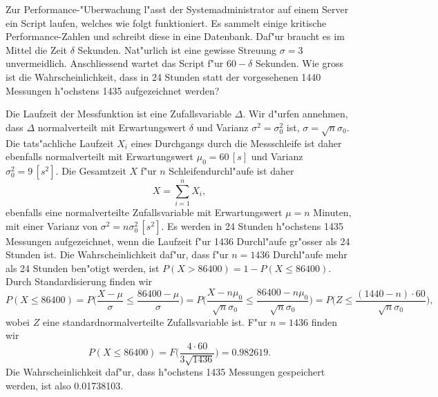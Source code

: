 Zur Performance-"Uberwachung l"asst der Systemadministrator auf einem Server
ein Script laufen, welches wie folgt funktioniert. Es sammelt einige
kritische Performance-Zahlen und schreibt diese in eine Datenbank.
Daf"ur braucht es im Mittel die Zeit $\delta$ Sekunden. Nat"urlich
ist eine gewisse Streuung $\sigma=3$ unvermeidlich.
Anschliessend wartet das Script f"ur $60-\delta$ Sekunden.
Wie gross ist die Wahrscheinlichkeit, dass in 24 Stunden statt
der vorgesehenen 1440 Messungen h"ochstens 1435 aufgezeichnet werden?

\begin{loesung}
Die Laufzeit der Messfunktion ist eine Zufallsvariable $\Delta$.
Wir d"urfen annehmen, dass $\Delta$ normalverteilt mit Erwartungswert
$\delta$ und Varianz $\sigma^2=\sigma_0^2$ ist, $\sigma=\sqrt{n}\sigma_0$.
Die tats"achliche Laufzeit $X_i$ eines
Durchgangs durch die Messschleife ist daher ebenfalls normalverteilt
mit Erwartungswert $\mu_0=60\,[s]$ und Varianz $\sigma_0^2=9\,[s^2]$.
Die Gesamtzeit $X$ f"ur
$n$ Schleifendurchl"aufe ist daher
\[
X=\sum_{i=1}^nX_i,
\]
ebenfalls eine normalverteilte Zufallsvariable
mit Erwartungswert $\mu = n$ Minuten,
mit einer Varianz von $\sigma^2=n\sigma_0^2\,[s^2]$.
Es werden in 24 Stunden h"ochstens 1435 Messungen aufgezeichnet,
wenn die Laufzeit f"ur
1436 Durchl"aufe gr"osser als 24 Stunden ist. Die Wahrscheinlichkeit daf"ur,
dass f"ur $n=1436$ Durchl"aufe mehr als 24 Stunden ben"otigt werden, 
ist $P(X > 86400) = 1-P(X\le 86400)$.
Durch Standardisierung finden wir
\[
P(X\le 86400)=P\biggl(
\frac{X-\mu}{\sigma}
\le
\frac{86400-\mu}{\sigma}
\biggr)
=
P\biggl(
\frac{X-n\mu_0}{\sqrt{n}\sigma_0}
\le
\frac{86400-n\mu_0}{\sqrt{n}\sigma_0}
\biggr)
=
P\biggl(
Z\le\frac{(1440-n)\cdot 60}{\sqrt{n}\sigma_0}
\biggr),
\]
wobei $Z$ eine standardnormalverteilte Zufallsvariable ist. F"ur $n=1436$
finden wir
\[
P(X\le 86400)=F\biggl(
\frac{4\cdot 60}{3\sqrt{1436}}
\biggr)=0.982619.
\]
Die Wahrscheinlichkeit daf"ur, dass h"ochstens 1435 Messungen gespeichert
werden, ist also 0.01738103.
\end{loesung}
